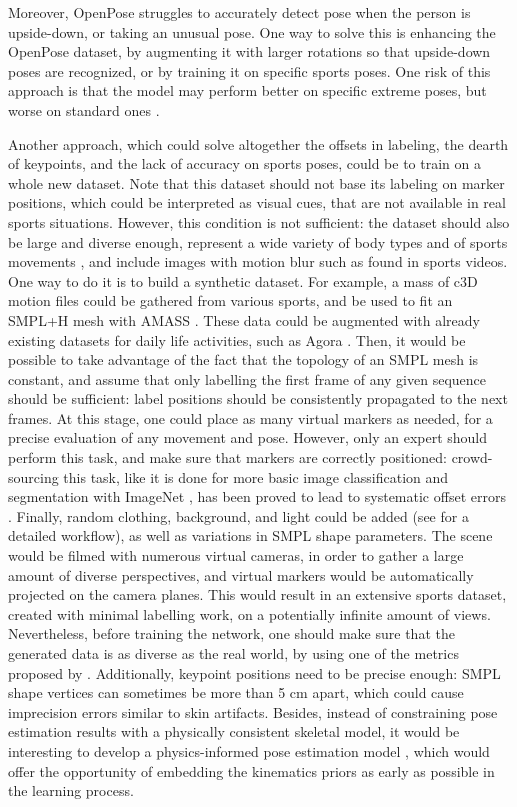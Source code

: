Moreover, OpenPose struggles to accurately detect pose when the person is upside-down, or taking an unusual pose. One way to solve this is enhancing the OpenPose dataset, by augmenting it with larger rotations so that upside-down poses are recognized, or by training it on specific sports poses. One risk of this approach is that the model may perform better on specific extreme poses, but worse on standard ones \cite{Kitamura2022}. 

Another approach, which could solve altogether the offsets in labeling, the dearth of keypoints, and the lack of accuracy on sports poses, could be to train on a whole new dataset. Note that this dataset should not base its labeling on marker positions, which could be interpreted as visual cues, that are not available in real sports situations. However, this condition is not sufficient: the dataset should also be large and diverse enough, represent a wide variety of body types and of sports movements \cite{Seethapathi2019}, and include images with motion blur such as found in sports videos. One way to do it is to build a synthetic dataset. For example, a mass of c3D motion files could be gathered from various sports, and be used to fit an SMPL+H mesh \cite{Pavlakos2019} with AMASS \cite{Mahmood2019}. These data could be augmented with already existing datasets for daily life activities, such as Agora \cite{Patel2021}. Then, it would be possible to take advantage of the fact that the topology of an SMPL mesh is constant, and assume that only labelling the first frame of any given sequence should be sufficient: label positions should be consistently propagated to the next frames. At this stage, one could place as many virtual markers as needed, for a precise evaluation of any movement and pose. However, only an expert should perform this task, and make sure that markers are correctly positioned: crowd-sourcing this task, like it is done for more basic image classification and segmentation with ImageNet \cite{Deng2009}, has been proved to lead to systematic offset errors \cite{Needham2021b}. Finally, random clothing, background, and light could be added (see \cite{Wood2021,Bolanos2021} for a detailed workflow), as well as variations in SMPL shape parameters. The scene would be filmed with numerous virtual cameras, in order to gather a large amount of diverse perspectives, and virtual markers would be automatically projected on the camera planes. This would result in an extensive sports dataset, created with minimal labelling work, on a potentially infinite amount of views. Nevertheless, before training the network, one should make sure that the generated data is as diverse as the real world, by using one of the metrics proposed by \cite{Borji2019, Borji2022}. Additionally, keypoint positions need to be precise enough: SMPL shape vertices can sometimes be more than 5 cm apart, which could cause imprecision errors similar to skin artifacts. Besides, instead of constraining pose estimation results with a physically consistent skeletal model, it would be interesting to develop a physics-informed pose estimation model \cite{Raissi2019}, which would offer the opportunity of embedding the kinematics priors as early as possible in the learning process.

